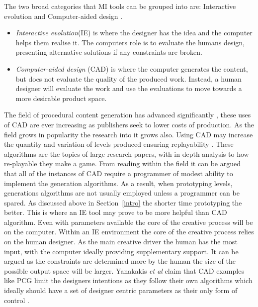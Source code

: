 \documentclass[journal]{IEEEtran}
\begin{document}
The two broad categories that MI tools can be grouped into are: Interactive evolution and Computer-aided design \cite{liapis2016mixed}. 
\begin{itemize}
    \item \textit{Interactive evolution}(IE) is where the designer has the idea and the computer helps them realise it. The computers role is to evaluate the humans design, presenting alternative solutions if any constraints are broken. 
    
    \item \textit{Computer-aided design} (CAD) is where the computer generates the content, but does not evaluate the quality of the produced work. Instead, a human designer will evaluate the work and use the evaluations to move towards a more desirable product space.
\end{itemize}

The field of procedural content generation has advanced significantly \cite{van2013designing}, these uses of CAD are ever increasing as publishers seek to lower costs of production\cite{doherty2005mixed, font2016constrained}. As the field grows in popularity the research into it grows also. Using CAD may increase the quantity and variation of levels produced ensuring replayability \cite{karavolos2015mixed}. These algorithms are the topics of large research papers, with in depth analysis to how re-playable they make a game. From reading within the field it can be argued that all of the instances of CAD require a programmer of modest ability to implement the generation algorithms. As a result, when prototyping levels, generations algorithms are not usually employed unless a programmer can be spared. As discussed above in Section~\ref{intro} the shorter time prototyping the better. This is where an IE tool may prove to be more helpful than CAD algorithm. Even with parameters available the core of the creative process will be on the computer. Within an IE environment  the core of the creative process relies on the human designer. As the main creative driver the human has the most input, with the computer ideally providing supplementary support. It can be argued as the constraints are determined more by the human the size of the possible output space will be larger. Yanakakis \textit{et al} \cite{yannakakis2014mixed} claim that CAD examples like PCG limit the designers intentions as they follow their own algorithms which ideally should have a set of designer centric parameters as their only form of control \cite{doran2010controlled}.
\end{document}
